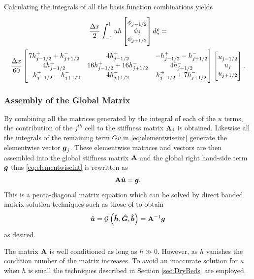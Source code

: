 Calculating the integrals of all the basis function combinations yields
\begin{multline*}
\frac{\Delta x}{2}\int_{-1 }^{1}  uh \begin{bmatrix} \TM
\phi_{j-1/2}\\\phi_j \\\phi_{j+1/2} \BM
\end{bmatrix} d\xi =  \\ \frac{\Delta x}{60}  \begin{bmatrix} \TM
7 h^+_{j-1/2} + h^-_{j+1/2} & 4 h^+_{j-1/2}   & - h^+_{j-1/2} - h^-_{j+1/2}\\ 4 h^+_{j-1/2} & 16 h^+_{j-1/2} + 16 h^-_{j+1/2}& 4 h^-_{j+1/2}\\ - h^+_{j-1/2} - h^-_{j+1/2} &  4 h^-_{j+1/2} &  h^+_{j-1/2} + 7 h^-_{j+1/2} \BM
\end{bmatrix}  \begin{bmatrix} \TM
u_{j-1/2}\\u_j \\u _{j+1/2} \BM
\end{bmatrix}.
\end{multline*}

\subsubsection{Assembly of the Global Matrix}
By combining all the matrices generated by the integral of each of the $u$ terms, the contribution of the $j^{th}$ cell to the stiffness matrix $\mathbf{A}_j$ is obtained. Likewise all the integrals of the remaining term $Gv$ in \eqref{eq:elementwiseint} generate the elementwise vector $\boldsymbol{g}_{j}$. These elementwise matrices and vectors are then assembled into the global stiffness matrix $\mathbf{A}$ and the global right hand-side term $\boldsymbol{g}$ thus \eqref{eq:elementwiseint} is rewritten as
\begin{equation}
\label{eqn:FEMElemMatrixJ}
 \mathbf{A} \boldsymbol{\hat{u}} = \boldsymbol{g}.
\end{equation}
This is a penta-diagonal matrix equation which can be solved by direct banded matrix solution techniques such as those of \citet{NumRecC-1996} to obtain
\begin{equation}
\boldsymbol{\hat{u}} =\mathcal{G}\left( \boldsymbol{\hat{h}}, \boldsymbol{\hat{G}},\boldsymbol{\hat{b}} \right) =   \mathbf{A}^{-1}\boldsymbol{g}
\label{eqn:usolvefromGhb}
\end{equation}
as desired.

The matrix $\mathbf{A}$ is well conditioned as long as $h\gg0$. However, as $h$ vanishes the condition number of the matrix increases. To avoid an inaccurate solution for $u$ when $h$ is small the techniques described in Section \ref{sec:DryBeds} are employed.  
